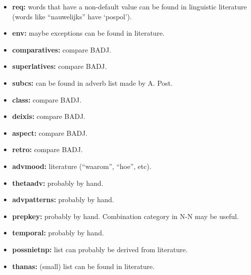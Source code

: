 \begin{itemize}
\item {\bf req:} words that have a non-default value can be found in 
        linguistic literature (words like ``nauwelijks'' have `pospol').
 
\item {\bf env:} maybe exceptions can be found in literature.
 
\item {\bf  comparatives:} compare BADJ.
 
\item {\bf  superlatives:} compare BADJ.
 
\item {\bf  subcs:} can be found in adverb list made by A. Post.
 
\item {\bf  class:} compare BADJ.
 
\item {\bf  deixis:} compare BADJ.
 
\item {\bf  aspect:} compare BADJ.
 
\item {\bf  retro:} compare BADJ.
 
\item {\bf  advmood:} literature (``waarom'', ``hoe'', etc).
 
\item {\bf  thetaadv:} probably by hand.
 
\item {\bf  advpatterns:} probably by hand.
 
\item {\bf  prepkey:} probably by hand. Combination category in N-N may be 
      useful.
 
\item {\bf  temporal:} probably by hand.
 
\item {\bf  possnietnp:} list can probably be derived from literature.
 
\item {\bf  thanas:} (small) list can be found in literature.
 
\end{itemize}
 
